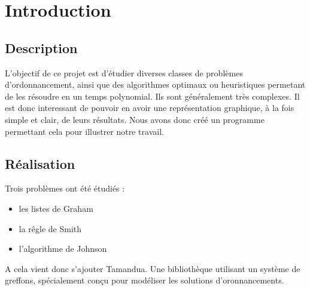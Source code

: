 \chapter{Introduction}
\section{Description}
L'objectif de ce projet est d'étudier diverses classes de problèmes 
d'ordonnancement, ainsi que des algorithmes optimaux ou heuristiques permetant
de les résoudre en un temps polynomial. Ils sont généralement très complexes. 
Il est donc interessant de pouvoir en avoir une représentation graphique, à la
fois simple et clair, de leurs résultats. Nous avons donc créé un programme
permettant cela pour illustrer notre travail.

\section{Réalisation}
Trois problèmes ont été étudiés :
\begin{itemize}
\item les listes de Graham
\item la rêgle de Smith
\item l'algorithme de Johnson
\end{itemize}
A cela vient donc s'ajouter Tamandua. Une bibliothèque utilisant un système de
greffons, spécialement conçu pour modéliser les solutions d'oronnancements.
